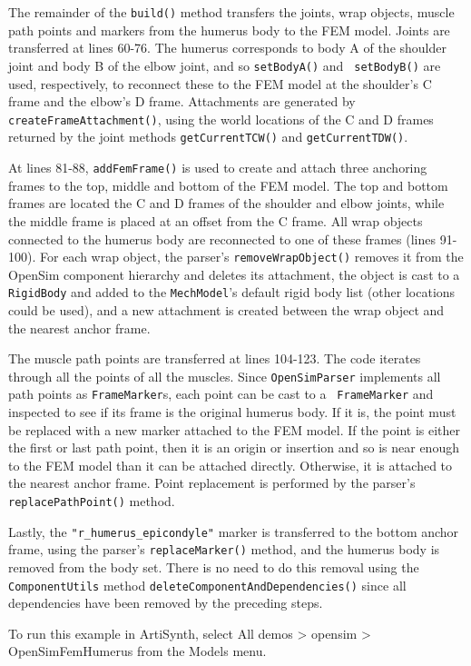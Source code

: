 The remainder of the {\tt build()} method transfers the joints, wrap objects,
muscle path points and markers from the humerus body to the FEM model.  Joints
are transferred at lines 60-76. The humerus corresponds to body A of the
shoulder joint and body B of the elbow joint, and so {\tt setBodyA()} and {\tt
setBodyB()} are used, respectively, to reconnect these to the FEM model at the
shoulder's C frame and the elbow's D frame.  Attachments are generated by {\tt
createFrameAttachment()}, using the world locations of the C and D frames
returned by the joint methods {\tt getCurrentTCW()} and {\tt getCurrentTDW()}.

At lines 81-88, {\tt addFemFrame()} is used to create and attach three
anchoring frames to the top, middle and bottom of the FEM model. The top and
bottom frames are located the C and D frames of the shoulder and elbow joints,
while the middle frame is placed at an offset from the C frame. All wrap
objects connected to the humerus body are reconnected to one of these frames
(lines 91-100). For each wrap object, the parser's {\tt removeWrapObject()}
removes it from the OpenSim component hierarchy and deletes its attachment, the
object is cast to a {\tt RigidBody} and added to the {\tt MechModel}'s default
rigid body list (other locations could be used), and a new attachment is
created between the wrap object and the nearest anchor frame.

The muscle path points are transferred at lines 104-123. The code iterates
through all the points of all the muscles. Since {\tt OpenSimParser} implements
all path points as {\tt FrameMarker}s, each point can be cast to a {\tt
FrameMarker} and inspected to see if its frame is the original humerus body. If
it is, the point must be replaced with a new marker attached to the FEM model.
If the point is either the first or last path point, then it is an origin or
insertion and so is near enough to the FEM model than it can be attached
directly. Otherwise, it is attached to the nearest anchor frame. Point
replacement is performed by the parser's {\tt replacePathPoint()} method.

Lastly, the {\tt "r\_humerus\_epicondyle"} marker is transferred to the bottom
anchor frame, using the parser's {\tt replaceMarker()} method, and the humerus
body is removed from the body set. There is no need to do this removal using
the {\tt ComponentUtils} method {\tt deleteComponentAndDependencies()} since
all dependencies have been removed by the preceding steps.

To run this example in ArtiSynth, select {\sf All demos > opensim >
OpenSimFemHumerus} from the {\sf Models} menu.

\ifdefined\maindoc
\else

\fi
